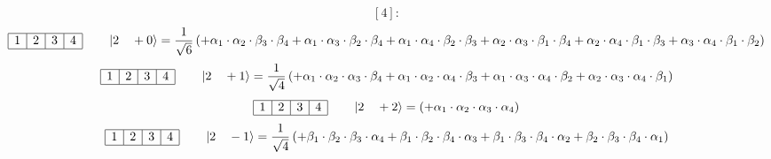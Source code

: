 \documentclass[fleqn]{article}%
\begin{document}
%
\vspace{0.25cm}%
\begin{dmath*}\left[4\right]:\end{dmath*}%
\vspace{0.25cm}%
\begin{dmath*}\begin{array}{|c|c|c|c|} \hline 1 & 2 & 3 & 4\\ \cline{1-4} \end{array} \qquad \ket{ 2 \quad  +0 } = \frac{1}{\sqrt{6}} \left( + \alpha_{1} \cdot \alpha_{2} \cdot \beta_{3} \cdot \beta_{4}  + \alpha_{1} \cdot \alpha_{3} \cdot \beta_{2} \cdot \beta_{4}  + \alpha_{1} \cdot \alpha_{4} \cdot \beta_{2} \cdot \beta_{3}  + \alpha_{2} \cdot \alpha_{3} \cdot \beta_{1} \cdot \beta_{4}  + \alpha_{2} \cdot \alpha_{4} \cdot \beta_{1} \cdot \beta_{3}  + \alpha_{3} \cdot \alpha_{4} \cdot \beta_{1} \cdot \beta_{2}\right) \end{dmath*}%
\vspace{0.25cm}%
\begin{dmath*}\begin{array}{|c|c|c|c|} \hline 1 & 2 & 3 & 4\\ \cline{1-4} \end{array} \qquad \ket{ 2 \quad  +1 } = \frac{1}{\sqrt{4}} \left( + \alpha_{1} \cdot \alpha_{2} \cdot \alpha_{3} \cdot \beta_{4}  + \alpha_{1} \cdot \alpha_{2} \cdot \alpha_{4} \cdot \beta_{3}  + \alpha_{1} \cdot \alpha_{3} \cdot \alpha_{4} \cdot \beta_{2}  + \alpha_{2} \cdot \alpha_{3} \cdot \alpha_{4} \cdot \beta_{1}\right) \end{dmath*}%
\vspace{0.25cm}%
\begin{dmath*}\begin{array}{|c|c|c|c|} \hline 1 & 2 & 3 & 4\\ \cline{1-4} \end{array} \qquad \ket{ 2 \quad  +2 } = \left( + \alpha_{1} \cdot \alpha_{2} \cdot \alpha_{3} \cdot \alpha_{4}\right) \end{dmath*}%
\vspace{0.25cm}%
\begin{dmath*}\begin{array}{|c|c|c|c|} \hline 1 & 2 & 3 & 4\\ \cline{1-4} \end{array} \qquad \ket{ 2 \quad  -1 } = \frac{1}{\sqrt{4}} \left( + \beta_{1} \cdot \beta_{2} \cdot \beta_{3} \cdot \alpha_{4}  + \beta_{1} \cdot \beta_{2} \cdot \beta_{4} \cdot \alpha_{3}  + \beta_{1} \cdot \beta_{3} \cdot \beta_{4} \cdot \alpha_{2}  + \beta_{2} \cdot \beta_{3} \cdot \beta_{4} \cdot \alpha_{1}\right) \end{dmath*}%
\end{document}
